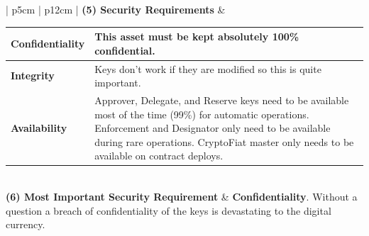 \documentclass[12pt]{article} %
\begin{document}
{\begin{center}
{\begin{tabular}{ | p{5cm} | p{12cm} | }
  \textbf{(5) Security Requirements} &
  	\hskip-0.2cm
  	\begin{tabular}{p{2.5cm}|p{9.06cm}}
		\textbf{Confidentiality} & This asset must be kept absolutely 100\% confidential.
		\\ \hline
		\textbf{Integrity} & Keys don't work if they are modified so this is quite important.
		\\ \hline
		\textbf{Availability} & Approver, Delegate, and Reserve keys need to be available most of the time (99\%) for automatic operations. Enforcement and Designator only need to be available during rare operations. CryptoFiat master only needs to be available on contract deploys.
	\end{tabular}
  \\ \hline
  \textbf{(6) Most Important Security Requirement} & \textbf{Confidentiality}. Without a question a breach of confidentiality of the keys is devastating to the digital currency.
  \\ \hline
\end{tabular}
}
\end{center}
\label{tab:assetProfileEthereumAdminKeys}

}
\end{document}
